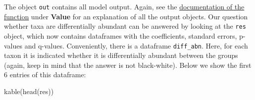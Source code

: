 \documentclass[
]{book}
\newenvironment{Shaded}{\begin{snugshade}}{\end{snugshade}}
\newcommand{\AttributeTok}[1]{\textcolor[rgb]{0.77,0.63,0.00}{#1}}
\newcommand{\CommentTok}[1]{\textcolor[rgb]{0.56,0.35,0.01}{\textit{#1}}}
\newcommand{\ConstantTok}[1]{\textcolor[rgb]{0.00,0.00,0.00}{#1}}
\newcommand{\DecValTok}[1]{\textcolor[rgb]{0.00,0.00,0.81}{#1}}
\newcommand{\FloatTok}[1]{\textcolor[rgb]{0.00,0.00,0.81}{#1}}
\newcommand{\FunctionTok}[1]{\textcolor[rgb]{0.00,0.00,0.00}{#1}}
\newcommand{\NormalTok}[1]{#1}
\newcommand{\OtherTok}[1]{\textcolor[rgb]{0.56,0.35,0.01}{#1}}
\newcommand{\SpecialCharTok}[1]{\textcolor[rgb]{0.00,0.00,0.00}{#1}}
\newcommand{\StringTok}[1]{\textcolor[rgb]{0.31,0.60,0.02}{#1}}
\begin{document}
\begin{Shaded}
\end{Shaded}

The object \texttt{out} contains all model output. Again, see the
\href{https://rdrr.io/github/FrederickHuangLin/ANCOMBC/man/ancombc.html}{documentation of the function}
under \textbf{Value} for an explanation of all the output objects. Our question
whether taxa are differentially abundant can be answered by looking at the
\texttt{res} object, which now contains dataframes with the coefficients,
standard errors, p-values and q-values. Conveniently, there is a dataframe
\texttt{diff\_abn}. Here, for each taxon it is indicated whether it is differentially
abundant between the groups (again, keep in mind that the answer is not
black-white). Below we show the first 6 entries of this dataframe:

\begin{Shaded}
\begin{Highlighting}[]
\FunctionTok{kable}\NormalTok{(}\FunctionTok{head}\NormalTok{(res))}
\end{Highlighting}
\end{Shaded}
\end{document}
